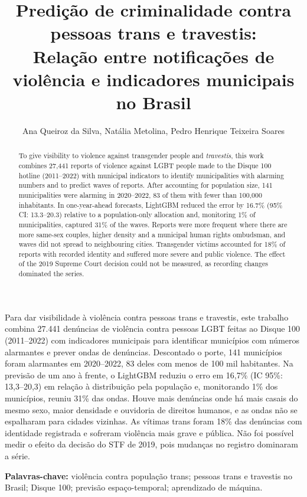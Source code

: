 \documentclass[12pt]{article}
\title{Predição de criminalidade contra pessoas trans e travestis: \\ Relação entre notificações de violência e indicadores municipais no Brasil}
\author{Ana Queiroz da Silva, Natália Metolina, Pedro Henrique Teixeira Soares}
\begin{document}
\maketitle
     
\begin{abstract}
To give visibility to violence against transgender people and \textit{travestis}, this work combines 27,441 reports of violence against LGBT people made to the Disque 100 hotline (2011--2022) with municipal indicators to identify municipalities with alarming numbers and to predict waves of reports. After accounting for population size, 141 municipalities were alarming in 2020--2022, 83 of them with fewer than 100,000 inhabitants. In one-year-ahead forecasts, LightGBM reduced the error by 16.7\% (95\% CI: 13.3--20.3) relative to a population-only allocation and, monitoring 1\% of municipalities, captured 31\% of the waves. Reports were more frequent where there are more same-sex couples, higher density and a municipal human rights ombudsman, and waves did not spread to neighbouring cities. Transgender victims accounted for 18\% of reports with recorded identity and suffered more severe and public violence. The effect of the 2019 Supreme Court decision could not be measured, as recording changes dominated the series.
\end{abstract}

\begin{resumo}
Para dar visibilidade à violência contra pessoas trans e travestis, este trabalho combina 27.441 denúncias de violência contra pessoas LGBT feitas ao Disque 100 (2011--2022) com indicadores municipais para identificar municípios com números alarmantes e prever ondas de denúncias. Descontado o porte, 141 municípios foram alarmantes em 2020--2022, 83 deles com menos de 100 mil habitantes. Na previsão de um ano à frente, o LightGBM reduziu o erro em 16,7\% (IC 95\%: 13,3--20,3) em relação à distribuição pela população e, monitorando 1\% dos municípios, reuniu 31\% das ondas. Houve mais denúncias onde há mais casais do mesmo sexo, maior densidade e ouvidoria de direitos humanos, e as ondas não se espalharam para cidades vizinhas. As vítimas trans foram 18\% das denúncias com identidade registrada e sofreram violência mais grave e pública. Não foi possível medir o efeito da decisão do STF de 2019, pois mudanças no registro dominaram a série.

\textbf{Palavras-chave:} violência contra população trans; pessoas trans e travestis no Brasil; Disque 100; previsão espaço-temporal; aprendizado de máquina.
\end{resumo}
\end{document}
